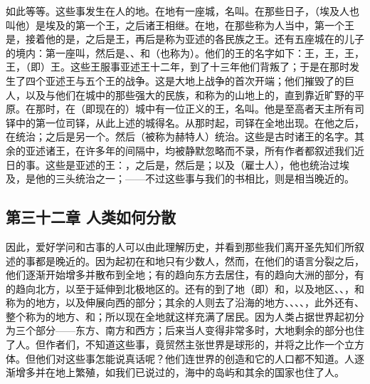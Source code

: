 如此等等。这些事发生在人的地。在地有一座城，名叫。在那些日子，（埃及人也叫他）是埃及的第一个王，之后诸王相继。在地，在那些称为人当中，第一个王是，接着他的是，之后是王，再后是称为亚述的各民族之王。还有五座城在的儿子的境内：第一座叫，然后是、、和（也称为）。他们的王的名字如下：王，王，王，王，（即）王。这些王服事亚述王十二年，到了十三年他们背叛了；于是在那时发生了四个亚述王与五个王的战争。这是大地上战争的首次开端；他们摧毁了的巨人，以及与他们在城中的那些强大的民族，和称为的山地上的，直到靠近旷野的平原。在那时，在（即现在的）城中有一位正义的王，名叫。他是至高者天主所有司铎中的第一位司铎，从此上述的城得名。从那时起，司铎在全地出现。在他之后，在统治；之后是另一个。然后（被称为赫特人）统治。这些是古时诸王的名字。其余的亚述诸王，在许多年的间隔中，均被静默忽略而不录，所有作者都叙述我们近日的事。这些是亚述的王：，之后是，然后是；以及（雇士人），他也统治过埃及，是他的三头统治之一；——不过这些事与我们的书相比，则是相当晚近的。\par


\subsection{第三十二章 人类如何分散}

因此，爱好学问和古事的人可以由此理解历史，并看到那些我们离开圣先知们所叙述的事都是晚近的。因为起初在和地只有少数人，然而，在他们的语言分裂之后，他们逐渐开始增多并散布到全地；有的趋向东方去居住，有的趋向大洲的部分，有的趋向北方，以至于延伸到北极地区的。还有的到了地（即）和，以及地区、、，和称为的地方，以及伸展向西的部分；其余的人则去了沿海的地方、、、、，此外还有、整个称为的地方、和；所以现在全地就这样充满了居民。因为人类占据世界起初分为三个部分——东方、南方和西方；后来当人变得非常多时，大地剩余的部分也住了人。但作者们，不知道这些事，竟贸然主张世界是球形的，并将之比作一个立方体。但他们对这些事怎能说真话呢？他们连世界的创造和它的人口都不知道。人逐渐增多并在地上繁殖，如我们已说过的，海中的岛屿和其余的国家也住了人。\par

